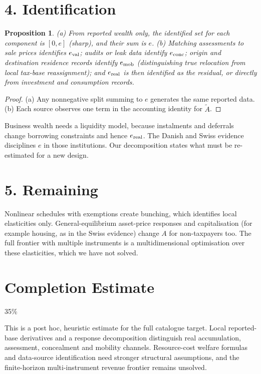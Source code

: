 \documentclass[11pt]{article}
\newtheorem{proposition}[theorem]{Proposition}
\theoremstyle{definition}
\begin{document}
\section*{4. Identification}
\begin{proposition}\label{prop:id}
(a) From reported wealth only, the identified set for each component is $[0,e]$ (sharp), and their sum is $e$.
(b) Matching assessments to sale prices identifies $e_{\rm val}$; audits or leak data identify $e_{\rm conc}$; origin and
destination residence records identify $e_{\rm mob}$ (distinguishing true relocation from local tax-base reassignment); and
$e_{\rm real}$ is then identified as the residual, or directly from investment and consumption records.
\end{proposition}
\begin{proof}
(a) Any nonnegative split summing to $e$ generates the same reported data. (b) Each source observes one term in the
accounting identity for $\widetilde A$.
\end{proof}
Business wealth needs a liquidity model, because instalments and deferrals change borrowing constraints and hence
$e_{\rm real}$. The Danish and Swiss evidence \cite{jjkz,bgks} disciplines $e$ in those institutions. Our decomposition states
what must be re-estimated for a new design.

\section*{5. Remaining}
Nonlinear schedules with exemptions create bunching, which identifies local elasticities only. General-equilibrium asset-price
responses and capitalisation (for example housing, as in the Swiss evidence) change $A$ for non-taxpayers too. The full
frontier with multiple instruments is a multidimensional optimisation over these elasticities, which we have not solved.

\section{Completion Estimate}
35\%

This is a post hoc, heuristic estimate for the full catalogue target.
Local reported-base derivatives and a response decomposition distinguish real accumulation, assessment, concealment and mobility channels. Resource-cost welfare formulas and data-source identification need stronger structural assumptions, and the finite-horizon multi-instrument revenue frontier remains unsolved.
\end{document}
